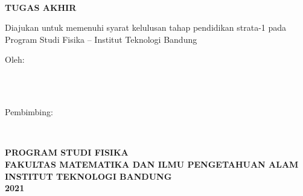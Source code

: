 \thispagestyle{empty}
\begin{center}
\begin{doublespace}
\textbf{\smaller\large{\MakeUppercase{\judul}}}\\[2.5cm]
\end{doublespace}

\textbf{\MakeUppercase{\large tugas akhir}}\\[0.5cm]
\begin{onehalfspace}
Diajukan untuk memenuhi syarat kelulusan tahap pendidikan strata-1 pada\\
Program Studi Fisika -- Institut Teknologi Bandung\\[1.8cm]
\end{onehalfspace}

\large Oleh: \\
\begin{onehalfspace}
\large{\penulis} \\
\large{\nim}\\[1.5cm]
\end{onehalfspace}
\vspace{1.5cm}

\large Pembimbing: \\
\begin{onehalfspace}
\large{\pembimbingsatu} \\
\large{\pembimbingdua}
\end{onehalfspace}

\vfill

\textbf{\large \MakeUppercase{program studi fisika}}\\
\textbf{\large \MakeUppercase{fakultas matematika dan ilmu pengetahuan alam}}\\
\textbf{\large \MakeUppercase{institut teknologi bandung}}\\
\textbf{\large 2021}\\
\end{center}

